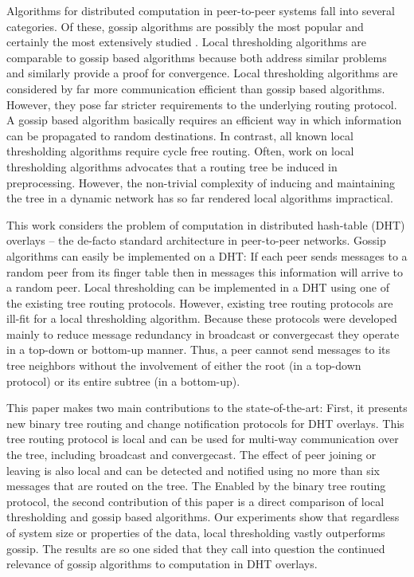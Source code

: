 \documentclass[12pt,english,journal]{elsarticle}
\numberwithin{equation}{section}
\numberwithin{figure}{section}
\theoremstyle{plain}
\theoremstyle{plain}
\begin{document}
Algorithms for distributed computation in peer-to-peer systems fall
into several categories. Of these, gossip algorithms are possibly
the most popular and certainly the most extensively studied \citep{KempeGossip,gossipBoyd,Gossip,gossipSpeedup,GossipVoting,gossipKalman,gossipKalman1,gossipSL,dynamicGossip}.
Local thresholding algorithms \citep{MajorityRulej,localRanking,l2,p2pDT,p2pEigen}
are comparable to gossip based algorithms because both address similar
problems and similarly provide a proof for convergence. Local thresholding
algorithms are considered by far more communication efficient than
gossip based algorithms. However, they pose far stricter requirements
to the underlying routing protocol. A gossip based algorithm basically
requires an efficient way in which information can be propagated to
random destinations. In contrast, all known local thresholding algorithms
require cycle free routing. Often, work on local thresholding algorithms
advocates that a routing tree be induced in preprocessing. However,
the non-trivial complexity of inducing and maintaining the tree in
a dynamic network has so far rendered local algorithms impractical.

This work considers the problem of computation in distributed hash-table
(DHT) overlays -- the de-facto standard architecture in peer-to-peer
networks. Gossip algorithms can easily be implemented on a DHT: If
each peer sends messages to a random peer from its finger table then
in  messages this  information will arrive
to a random peer. Local thresholding can be implemented in a DHT using
one of the existing tree routing protocols. However, existing tree
routing protocols \citep{DHTTree1,DHTTree2,dhttreeJ} are ill-fit
for a local thresholding algorithm. Because these protocols were developed
mainly to reduce message redundancy in broadcast or convergecast they
operate in a top-down or bottom-up manner. Thus, a peer cannot send
messages to its tree neighbors without the involvement of either the
root (in a top-down protocol) or its entire subtree (in a bottom-up). 

This paper makes two main contributions to the state-of-the-art: First,
it presents new binary tree routing and change notification protocols
for DHT overlays. This tree routing protocol is local and can be used
for multi-way communication over the tree, including broadcast and
convergecast. The effect of peer joining or leaving is also local
and can be detected and notified using no more than six messages that
are routed on the tree. The Enabled by the binary tree routing protocol,
the second contribution of this paper is a direct comparison of local
thresholding and gossip based algorithms. Our experiments show that
regardless of system size or properties of the data, local thresholding
vastly outperforms gossip. The results are so one sided that they
call into question the continued relevance of gossip algorithms to
computation in DHT overlays.
\end{document}
